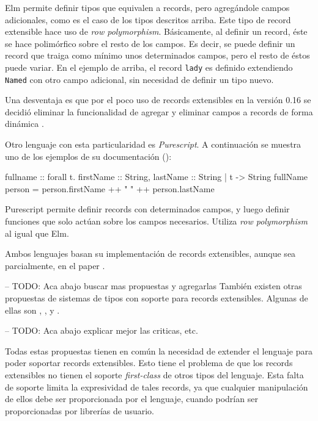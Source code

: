 Elm permite definir tipos que equivalen a records, pero agregándole campos adicionales, como es el caso de los tipos descritos arriba. Este tipo de record extensible hace uso de \textit{row polymorphism}. Básicamente, al definir un record, éste se hace polimórfico sobre el resto de los campos. Es decir, se puede definir un record que traiga como mínimo unos determinados campos, pero el resto de éstos puede variar. En el ejemplo de arriba, el record \texttt{lady} es definido extendiendo \texttt{Named} con otro campo adicional, sin necesidad de definir un tipo nuevo. 

Una desventaja es que por el poco uso de records extensibles en la versión 0.16 se decidió eliminar la funcionalidad de agregar y eliminar campos a records de forma dinámica \cite{ElmReducedRecordSyntax}.

Otro lenguaje con esta particularidad es \textit{Purescript}\cite{PurescriptByExample}. A continuación se muestra uno de los ejemplos de su documentación (\cite{PurescriptRecords}):

\begin{code}
fullname :: forall t. { firstName :: String, 
  lastName :: String | t } -> String 
fullName person = person.firstName ++ " " ++ person.lastName
\end{code}

Purescript permite definir records con determinados campos, y luego definir funciones que solo actúan sobre los campos necesarios. Utiliza \textit{row polymorphism} al igual que Elm.

Ambos lenguajes basan su implementación de records extensibles, aunque sea parcialmente, en el paper \cite{Leijen:scopedlabels}.

-- TODO: Aca abajo buscar mas propuestas y agregarlas
También existen otras propuestas de sistemas de tipos con soporte para records extensibles. Algunas de ellas son \cite{Leijen:fclabels}, \cite{Jeltsch:2010:GRC:1836089.1836108}, y \cite{Gaster96apolymorphic}.

-- TODO: Aca abajo explicar mejor las criticas, etc.

Todas estas propuestas tienen en común la necesidad de extender el lenguaje para poder soportar records extensibles. Esto tiene el problema de que los records extensibles no tienen el soporte \textit{first-class} de otros tipos del lenguaje. Esta falta de soporte limita la expresividad de tales records, ya que cualquier manipulación de ellos debe ser proporcionada por el lenguaje, cuando podrían ser proporcionadas por librerías de usuario.


